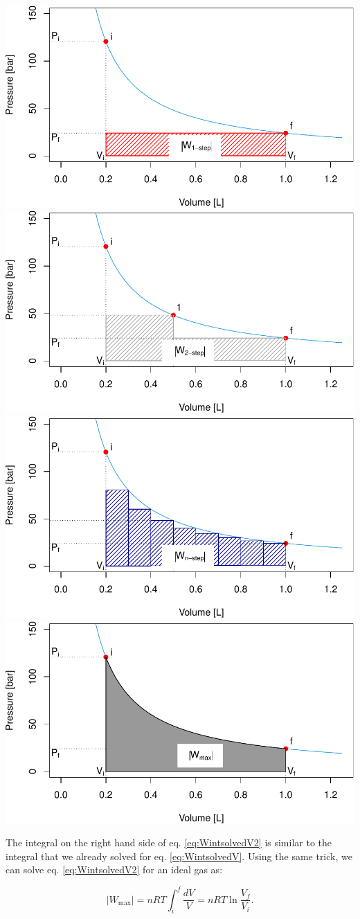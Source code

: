 \documentclass[
]{book}
\theoremstyle{definition}
\theoremstyle{definition}
\theoremstyle{definition}
\theoremstyle{remark}
\begin{document}
\includegraphics[width=0.5\linewidth,height=1\textheight]{pchem1_files/figure-latex/figures-side-1} \includegraphics[width=0.5\linewidth,height=1\textheight]{pchem1_files/figure-latex/figures-side-2} \includegraphics[width=0.5\linewidth,height=1\textheight]{pchem1_files/figure-latex/figures-side-3} \includegraphics[width=0.5\linewidth,height=1\textheight]{pchem1_files/figure-latex/figures-side-4}

The integral on the right hand side of eq. \eqref{eq:WintsolvedV2} is similar to the integral that we already solved for eq. \eqref{eq:WintsolvedV}. Using the same trick, we can solve eq. \eqref{eq:WintsolvedV2} for an ideal gas as:

\begin{equation}
  \left| W_{\text{max}} \right| = nRT \int_{i}^{f} \frac{dV}{V} = nRT \ln \frac{V_f}{V_i}.
  \label{eq:WmaxV}
\end{equation}
\end{document}
